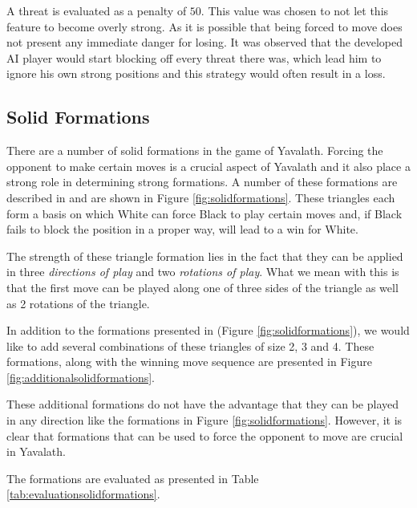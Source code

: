 \documentclass[11pt]{article}
\begin{document}


A threat is evaluated as a penalty of $50$. This value was chosen to not let this feature to become overly strong. As it is possible that being forced to move does not present any immediate danger for losing. It was observed that the developed AI player would start blocking off every threat there was, which lead him to ignore his own strong positions and this strategy would often result in a loss.

\subsection{Solid Formations}
\label{-subsec:solidformations}
There are a number of solid formations in the game of Yavalath. Forcing the opponent to make certain moves is a crucial aspect of Yavalath and it also place a strong role in determining strong formations. A number of these formations are described in \cite{browne2011evolutionary} and are shown in Figure \ref{fig:solidformations}. These triangles each form a basis on which White can force Black to play certain moves and, if Black fails to block the position in a proper way, will lead to a win for White.



The strength of these triangle formation lies in the fact that they can be applied in three \emph{directions of play} and two \emph{rotations of play}. What we mean with this is that the first move can be played along one of three sides of the triangle as well as 2 rotations of the triangle.

In addition to the formations presented in \cite{browne2011evolutionary} (Figure \ref{fig:solidformations}), we would like to add several combinations of these triangles of size 2, 3 and 4. These formations, along with the winning move sequence are presented in Figure \ref{fig:additionalsolidformations}.



These additional formations do not have the advantage that they can be played in any direction like the formations in Figure \ref{fig:solidformations}. However, it is clear that formations that can be used to force the opponent to move are crucial in Yavalath.

The formations are evaluated as presented in Table \ref{tab:evaluationsolidformations}.


\end{document}
